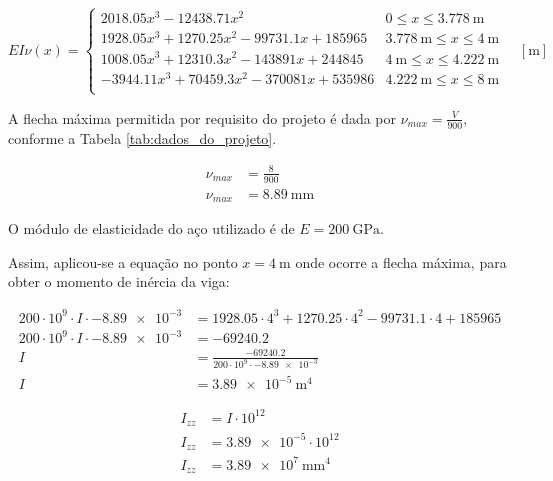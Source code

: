 \[
  EI \nu(x) =
  \begin{cases}
    \num{2018.05}x^3 - \num{12438.71}x^2                                & 0 \leq x \leq \SI{3.778}{\meter}              \\
    \num{1928.05}x^3 + \num{1270.25}x^2 - \num{99731.1}x + \num{185965} & \SI{3.778}{\meter} \leq x \leq \SI{4}{\meter} \\
    \num{1008.05}x^3 + \num{12310.3}x^2 - \num{143891}x + \num{244845}  & \SI{4}{\meter} \leq x \leq \SI{4.222}{\meter} \\
    -\num{3944.11}x^3 + \num{70459.3}x^2 - \num{370081}x + \num{535986} & \SI{4.222}{\meter} \leq x \leq \SI{8}{\meter} \\
  \end{cases}
  \quad \left[ \si{\meter} \right]
\]

A flecha máxima permitida por requisito do projeto é dada por $\nu_{max} = \frac{V}{900}$, conforme a Tabela \ref{tab:dados_do_projeto}.

\begin{align*}
  \nu_{max} & = \frac{8}{900}                   \\
  \nu_{max} & = \boxed{\SI{8.89}{\milli\meter}}
\end{align*}

O módulo de elasticidade do aço utilizado é de $E = \SI{200}{\giga\pascal}$.

Assim, aplicou-se a equação no ponto $x = \SI{4}{\meter}$ onde ocorre a flecha máxima, para obter o momento de inércia da viga:

\begin{align*}
  200 \cdot 10^9 \cdot I \cdot -\num{8.89e-3} & = \num{1928.05} \cdot 4^3 + \num{1270.25} \cdot 4^2 - \num{99731.1} \cdot 4 + \num{185965} \\
  200 \cdot 10^9 \cdot I \cdot -\num{8.89e-3} & = -\num{69240.2}                                                                           \\
  I                                           & = \frac{-\num{69240.2}}{200 \cdot 10^9 \cdot -\num{8.89e-3}}                               \\
  I                                           & = \boxed{\SI{3.89e-5}{\meter^4}}
\end{align*}

\begin{align*}
  I_{zz} & = I \cdot 10^{12}                     \\
  I_{zz} & = \SI{3.89e-5} \cdot 10^{12}          \\
  I_{zz} & = \boxed{\SI{3.89e7}{\milli\meter^4}}
\end{align*}

